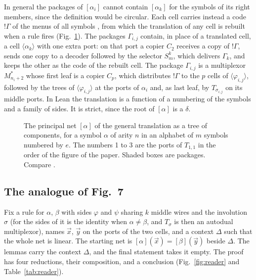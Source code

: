 \documentclass[11pt,a4paper]{article}
\newcommand{\pp}[1]{\cite[#1]{lafont1997}}
\begin{document}
In general the packages of $[\alpha_i]$ cannot contain $[\alpha_k]$ for the symbols of its
right members, since the definition would be circular. Each
cell carries instead a code $!\Gamma$ of the menus of all symbols \pp{Fig.~10}, from
which the translation of any cell is rebuilt when a rule fires (Fig.~\ref{fig:cell}). The
packages $\Gamma_{i,j}$ contain, in place of a translated cell, a cell
$\langle\alpha_k\rangle$ with one extra port: on that port a copier $C_2$ receives a copy of
$!\Gamma$, sends one copy to a decoder followed by the selector $S^k_m$, which delivers
$\Gamma_k$, and keeps the other as the code of the rebuilt cell. The package $\Gamma_{i,j}$ is a multiplexor $M^*_{n_i+2}$ whose first leaf is a copier $C_p$,
which distributes $!\Gamma$ to the $p$ cells of $\langle\varphi_{i,j}\rangle$, followed by the
trees of $\langle\varphi_{i,j}\rangle$ at the ports of $\alpha_i$ and, as last leaf, by
$T_{\sigma_{i,j}}$ on its middle ports. In Lean
the translation is a function  of a numbering  of the
symbols and a family  of sides. It is strict, since the root of $[\alpha]$ is a
$\delta$.

\begin{figure}[H]
\centering

\caption{The principal net $[\alpha]$ of the general translation as a tree of components, for
a symbol $\alpha$ of arity $n$ in an alphabet of $m$ symbols numbered by $e$. The numbers 1 to
3 are the ports of $T_{1,1}$ in the order of the figure of the paper. Shaded boxes are
packages. Compare \pp{Fig.~10, top left}.}
\label{fig:cell}
\end{figure}

\subsection{The analogue of Fig.~7}
\label{sec:reader}

Fix a rule for $\alpha$, $\beta$ with sides $\varphi$ and $\psi$ sharing $k$ middle wires and
the involution $\sigma$ (for the sides of  it is the identity when
$\alpha \neq \beta$, and $T_\sigma$ is then an autodual multiplexor), names $\vec x$, $\vec y$ on the ports of the two cells, and a context
$\Delta$ such that the whole net is linear. The starting net is $[\alpha](\vec x) =
[\beta](\vec y)$ beside $\Delta$. The lemmas carry the context $\Delta$, and the final
statement takes it empty. The proof has four reductions, their composition, and a conclusion
(Fig.~\ref{fig:reader} and Table~\ref{tab:reader}).
\end{document}
